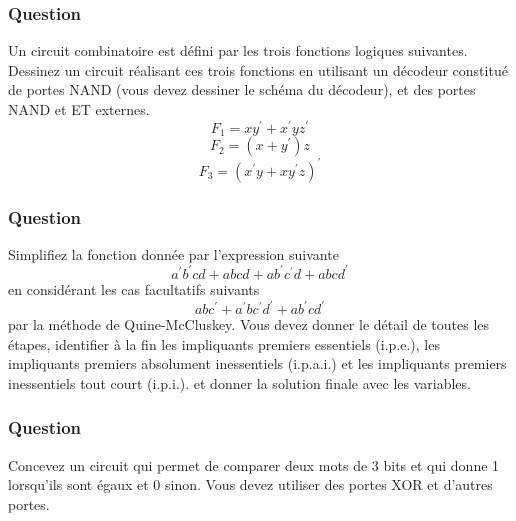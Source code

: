 \documentclass[11pt]{article}
\begin{document}
\subsubsection*{Question}
\label{sec:org5ff18be}
Un circuit combinatoire est défini par les trois fonctions logiques
  suivantes. Dessinez un circuit réalisant ces trois fonctions en
  utilisant un décodeur constitué de portes NAND (vous devez dessiner
  le schéma du décodeur), et des portes NAND et ET
  externes.
  $$
     F_1  = x y^{\prime} + x^{\prime}y
    z^{\prime} 
    $$
  $$
    F_2  =  (x + y^{\prime})z 
    $$
  $$ F_3  =  (x^{\prime}
    y + x y^{\prime} z)^{\prime}
    $$

\subsubsection*{Question}
\label{sec:org5ef5437}
Simplifiez la fonction donnée par l'expression suivante
  $$
    a^{\prime} b^{\prime} c d + a b c d + a b^{\prime} c^{\prime} d +
	a b c d^{\prime}
    $$
  en considérant les cas facultatifs suivants
  $$
    a b c^{\prime} + a^{\prime} b c^{\prime} d^{\prime} + a b^{\prime}
	c d^{\prime}
    $$
  par la méthode de Quine-McCluskey. Vous devez
  donner le détail de toutes les étapes, identifier à la fin les
  impliquants premiers essentiels (i.p.e.), les impliquants premiers
  absolument inessentiels (i.p.a.i.) et les impliquants premiers
  inessentiels tout court (i.p.i.). et donner la solution finale avec
  les variables.

\subsubsection*{Question}
\label{sec:org4d7ae3d}
Concevez un circuit qui permet de comparer deux mots de 3 bits et qui
  donne 1 lorsqu'ils sont égaux et 0 sinon. Vous devez utiliser des
  portes XOR et d'autres portes.
\end{document}
